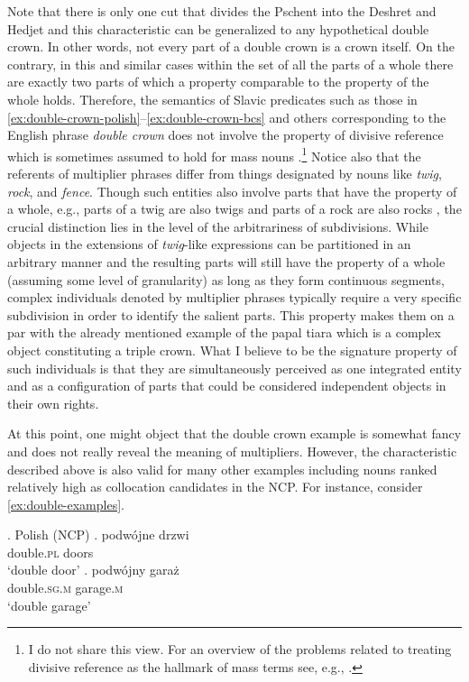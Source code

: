 Note that there is only one cut that divides the Pschent into the Deshret and Hedjet and this characteristic can be generalized to any hypothetical double crown. In other words, not every part of a double crown is a crown itself. On the contrary, in this and similar cases within the set of all the parts of a whole there are exactly two parts of which a property comparable to the property of the whole holds. Therefore, the semantics of Slavic predicates such as those in \ref{ex:double-crown-polish}--\ref{ex:double-crown-bcs} and others corresponding to the English phrase \textit{double crown} does not involve the property of divisive reference which is sometimes assumed to hold for mass nouns \citep[e.g.,][]{cheng1973comments}.\footnote{I do not share this view. For an overview of the problems related to treating divisive reference as the hallmark of mass terms see, e.g., \citet[pp. 111--119]{grimm2012number}.} Notice also that the referents of multiplier phrases differ from things designated by nouns like \textit{twig}, \textit{rock}, and \textit{fence}. Though such entities also involve parts that have the property of a whole, e.g., parts of a twig are also twigs and parts of a rock are also rocks \citep[e.g.,]{zucchi_white2001twigs,rothstein2010counting}, the crucial distinction lies in the level of the arbitrariness of subdivisions. While objects in the extensions of \textit{twig}-like expressions can be partitioned in an arbitrary manner and the resulting parts will still have the property of a whole (assuming some level of granularity) as long as they form continuous segments, complex individuals denoted by multiplier phrases typically require a very specific subdivision in order to identify the salient parts. This property makes them on a par with the already mentioned example of the papal tiara \citep[see][p. 70]{wiggins1980sameness} which is a complex object constituting a triple crown. What I believe to be the signature property of such individuals is that they are simultaneously perceived as one integrated entity and as a configuration of parts that could be considered independent objects in their own rights.

At this point, one might object that the double crown example is somewhat fancy and does not really reveal the meaning of multipliers. However, the characteristic described above is also valid for many other examples including nouns ranked relatively high as collocation candidates in the NCP. For instance, consider \ref{ex:double-examples}.

\ex. Polish (NCP)\label{ex:double-examples}
\ag. podwójne drzwi\\
double\textsc{.pl} doors\\
`double door'\label{ex:double-door}
\bg. podwójny garaż\\
double\textsc{.sg.m} garage\textsc{.m}\\
`double garage'\label{ex:double-garage}

